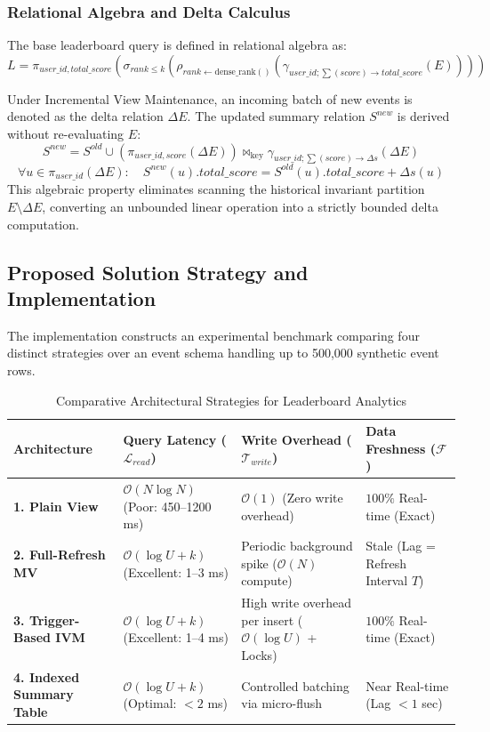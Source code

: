 \documentclass[11pt,a4paper]{report}
\begin{document}
\subsubsection{Relational Algebra and Delta Calculus}
The base leaderboard query is defined in relational algebra as:
$$L = \pi_{user\_id, total\_score} \left( \sigma_{rank \le k} \left( \rho_{rank \leftarrow \text{dense\_rank}()} \left( \gamma_{user\_id; \sum(score) \rightarrow total\_score} (E) \right) \right) \right)$$

Under Incremental View Maintenance, an incoming batch of new events is denoted as the delta relation $\Delta E$. The updated summary relation $S^{new}$ is derived without re-evaluating $E$:
$$S^{new} = S^{old} \cup \left( \pi_{user\_id, score} (\Delta E) \right) \bowtie_{\text{key}} \gamma_{user\_id; \sum(score) \rightarrow \Delta s} (\Delta E)$$
$$\forall u \in \pi_{user\_id}(\Delta E): \quad S^{new}(u).total\_score = S^{old}(u).total\_score + \Delta s(u)$$
This algebraic property eliminates scanning the historical invariant partition $E \setminus \Delta E$, converting an unbounded linear operation into a strictly bounded delta computation.

\subsection{Proposed Solution Strategy and Implementation}
The implementation constructs an experimental benchmark comparing four distinct strategies over an event schema handling up to 500,000 synthetic event rows.

\begin{table}[h!]
    \centering
    \caption{Comparative Architectural Strategies for Leaderboard Analytics}
    \vspace{2mm}
    \begin{tabular}{|l|p{3.5cm}|p{3.5cm}|p{3.5cm}|}
        \hline
        \textbf{Architecture} & \textbf{Query Latency ($\mathcal{L}_{read}$)} & \textbf{Write Overhead ($\mathcal{T}_{write}$)} & \textbf{Data Freshness ($\mathcal{F}$)} \\ \hline
        \textbf{1. Plain View} & $\mathcal{O}(N \log N)$ (Poor: 450--1200 ms) & $\mathcal{O}(1)$ (Zero write overhead) & $100\%$ Real-time (Exact) \\ \hline
        \textbf{2. Full-Refresh MV} & $\mathcal{O}(\log U + k)$ (Excellent: 1--3 ms) & Periodic background spike ($\mathcal{O}(N)$ compute) & Stale (Lag = Refresh Interval $T$) \\ \hline
        \textbf{3. Trigger-Based IVM} & $\mathcal{O}(\log U + k)$ (Excellent: 1--4 ms) & High write overhead per insert ($\mathcal{O}(\log U)$ + Locks) & $100\%$ Real-time (Exact) \\ \hline
        \textbf{4. Indexed Summary Table} & $\mathcal{O}(\log U + k)$ (Optimal: $< 2$ ms) & Controlled batching via micro-flush & Near Real-time (Lag $< 1$ sec) \\ \hline
    \end{tabular}
\end{table}
\end{document}
